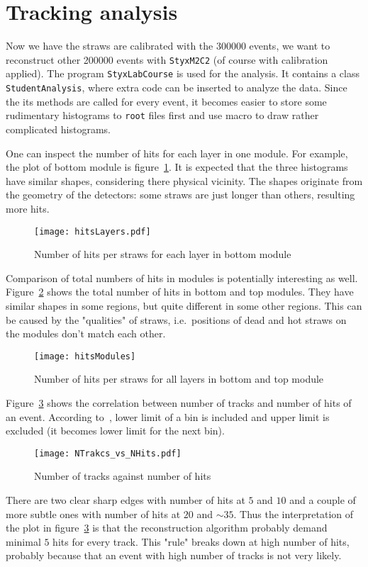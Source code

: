 \clearpage
\section{Tracking analysis}\label{sec:ana}
Now we have the straws are calibrated with the \num{300 000} events, we want to reconstruct other \num{200 000} events with \verb|StyxM2C2| (of course with calibration applied). The program \verb|StyxLabCourse| is used for the analysis. It contains a class \verb|StudentAnalysis|, where extra code can be inserted to analyze the data. Since the its methods are called for every event, it becomes easier to store some rudimentary histograms to \verb|root| files first and use macro to draw rather complicated histograms.

One can inspect the number of hits for each layer in one module. For example, the plot of bottom module is figure~\ref{fig:hitsLayers}. It is expected that the three histograms have similar shapes, considering there physical vicinity. The shapes originate from the geometry of the detectors: some straws are just longer than others, resulting more hits.
\begin{figure}[ht]
	\centering
	\texttt{[image: hitsLayers.pdf]}
	\caption{Number of hits per straws for each layer in bottom module}%
	\label{fig:hitsLayers}
\end{figure}

Comparison of total numbers of hits in modules is potentially interesting as well. Figure~\ref{fig:hitsModules} shows the total number of hits in bottom and top modules. They have similar shapes in some regions, but quite different in some other regions. This can be caused by the "qualities" of straws, i.e.~positions of dead and hot straws on the modules don't match each other.
\begin{figure}[H]
	\centering
	\texttt{[image: hitsModules]}
	\caption{Number of hits per straws for all layers in bottom and top module}
	\label{fig:hitsModules}
\end{figure}

Figure~\ref{fig:NTrakcs_vs_NHits} shows the correlation between number of tracks and number of hits of an event. According to~\cite{root-bins}, lower limit of a bin is included and upper limit is excluded (it becomes lower limit for the next bin). 

\begin{figure}[ht]
	\centering
	\texttt{[image: NTrakcs\_vs\_NHits.pdf]}
	\caption{Number of tracks against number of hits}%
	\label{fig:NTrakcs_vs_NHits}
\end{figure}
There are two clear sharp edges with number of hits at $5$ and $10$ and a couple of more subtle ones with number of hits at $20$ and $\sim 35$. Thus the interpretation of the plot in figure~\ref{fig:NTrakcs_vs_NHits} is that the reconstruction algorithm probably demand minimal $5$ hits for every track. This "rule" breaks down at high number of hits, probably because that an event with high number of tracks is not very likely.

